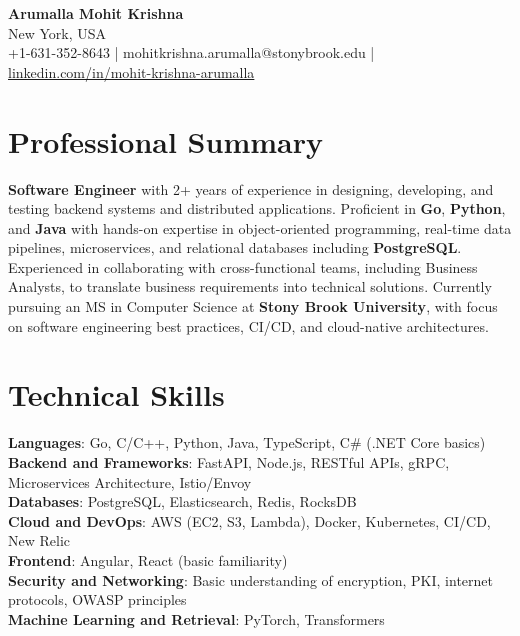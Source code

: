 \documentclass[letterpaper,11pt]{article}
\begin{document}
\begin{center}
  {\Large \textbf{Arumalla Mohit Krishna}} \\
  New York, USA \\
  +1-631-352-8643 \enspace | \enspace mohitkrishna.arumalla@stonybrook.edu \enspace | \enspace \href{https://www.linkedin.com/in/mohit-krishna-arumalla}{linkedin.com/in/mohit-krishna-arumalla}
\end{center}

\section{Professional Summary}
  \begin{itemize}[leftmargin=0.15in, label={}]
    \small{\item{
     \textbf{Software Engineer} with 2+ years of experience in designing, developing, and testing backend systems and distributed applications. Proficient in \textbf{Go}, \textbf{Python}, and \textbf{Java} with hands-on expertise in object-oriented programming, real-time data pipelines, microservices, and relational databases including \textbf{PostgreSQL}. Experienced in collaborating with cross-functional teams, including Business Analysts, to translate business requirements into technical solutions. Currently pursuing an MS in Computer Science at \textbf{Stony Brook University}, with focus on software engineering best practices, CI/CD, and cloud-native architectures.
    }}
  \end{itemize}
\vspace{-16pt}

\section{Technical Skills}
 \begin{itemize}[leftmargin=0.15in, label={}]
    \small{\item{
     \textbf{Languages}: Go, C/C++, Python, Java, TypeScript, C\# (.NET Core basics) \\
     \textbf{Backend and Frameworks}: FastAPI, Node.js, RESTful APIs, gRPC, Microservices Architecture, Istio/Envoy \\
     \textbf{Databases}: PostgreSQL, Elasticsearch, Redis, RocksDB \\
     \textbf{Cloud and DevOps}: AWS (EC2, S3, Lambda), Docker, Kubernetes, CI/CD, New Relic \\
     \textbf{Frontend}: Angular, React (basic familiarity) \\
     \textbf{Security and Networking}: Basic understanding of encryption, PKI, internet protocols, OWASP principles \\
     \textbf{Machine Learning and Retrieval}: PyTorch, Transformers
    }}
 \end{itemize}
\vspace{-16pt}
\end{document}
